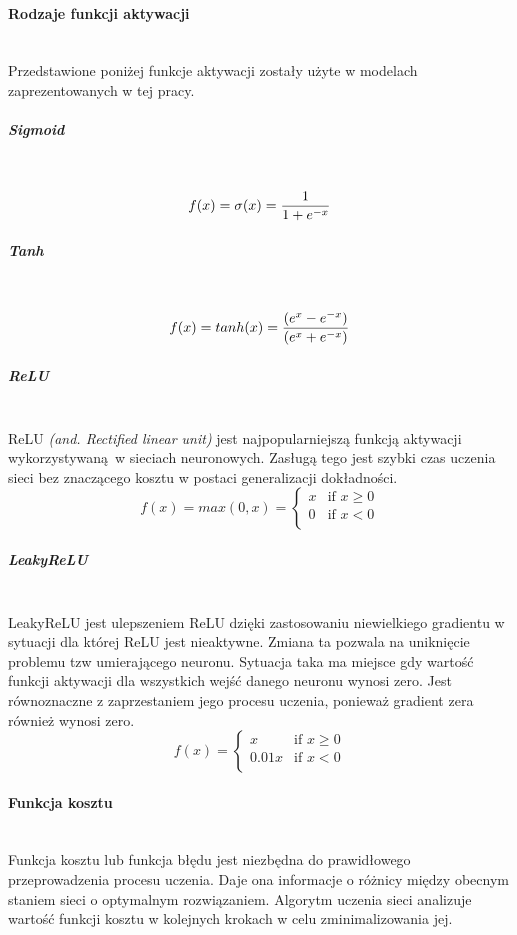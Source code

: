 \paragraph{Rodzaje funkcji aktywacji} \mbox{}\\
Przedstawione poniżej funkcje aktywacji zostały użyte w modelach zaprezentowanych
w tej pracy.

\subparagraph{Sigmoid} \mbox{}\\
\begin{equation}
f(x) = \sigma(x) = \frac{1}{1 + e^{-x}} \\
\end{equation}

\subparagraph{Tanh} \mbox{}\\
\begin{equation}
f(x) = tanh(x) = \frac{(e^x - e^{-x})}{(e^x + e^{-x})} \\
\end{equation}

\subparagraph{ReLU} \mbox{}\\
ReLU \textit{(and. Rectified linear unit)} jest najpopularniejszą funkcją aktywacji
wykorzystywaną w sieciach neuronowych. Zasługą tego jest szybki czas uczenia sieci
bez znaczącego kosztu w postaci generalizacji dokładności.
\begin{equation}
f(x) = max(0, x) =
\begin{cases}
 x & \text{if } x \geqslant 0 \\
 0 & \text{if } x < 0 \\
\end{cases}
\end{equation}

\subparagraph{LeakyReLU} \mbox{}\\
LeakyReLU jest ulepszeniem ReLU dzięki zastosowaniu niewielkiego gradientu w sytuacji
dla której ReLU jest nieaktywne. Zmiana ta pozwala na uniknięcie problemu tzw
umierającego neuronu. Sytuacja taka ma miejsce gdy wartość funkcji aktywacji dla
wszystkich wejść danego neuronu wynosi zero. Jest równoznaczne z zaprzestaniem
jego procesu uczenia, ponieważ gradient zera również wynosi zero.
\begin{equation}
f(x) =
\begin{cases}
 x & \text{if } x \geqslant 0 \\
 0.01x & \text{if } x < 0 \\
\end{cases}
\end{equation}

\paragraph{Funkcja kosztu} \mbox{}\\
Funkcja kosztu lub funkcja błędu jest niezbędna do prawidłowego przeprowadzenia
procesu uczenia. Daje ona informacje o różnicy między obecnym staniem sieci o
optymalnym rozwiązaniem. Algorytm uczenia sieci analizuje wartość funkcji kosztu
w kolejnych krokach w celu zminimalizowania jej.

